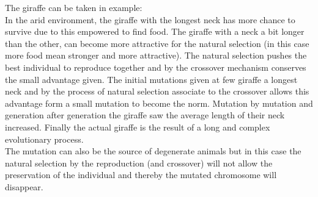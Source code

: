 The giraffe can be taken in example:\\
 In the arid environment, the giraffe with the longest neck has more chance to survive due to this empowered to find food. The giraffe with a neck a bit longer than the other, can become more attractive for the natural selection (in this case more food mean stronger and more attractive). The natural selection pushes the best individual to reproduce together and by the crossover mechanism conserves the small advantage given. The initial mutations given at few giraffe a longest neck and by the process of natural selection associate to the crossover allows this advantage form a small mutation to become the norm. Mutation by mutation and generation after generation the giraffe  saw the average length of their neck increased. Finally the actual giraffe is the result of a long and complex evolutionary process. \\ 
The mutation can also be the source of degenerate animals but in this case the natural selection  by the reproduction (and crossover) will not allow the preservation of the individual and thereby the mutated chromosome will disappear.\\ 
